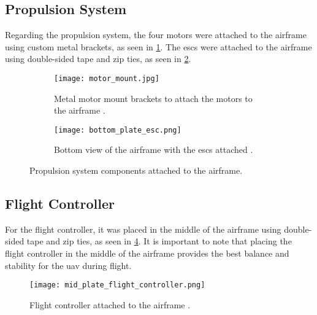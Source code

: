 \subsection{Propulsion System}\label{subsec:implementation_propulsion_system}

Regarding the propulsion system, the four motors were attached to the airframe using custom metal brackets, as seen in \cref{fig:motors_attached_to_airframe}. The \glspl{esc} were attached to the airframe using double-sided tape and zip ties, as seen in \cref{fig:esc_attached_to_airframe}.

\begin{figure}
  \begin{subfigure}{0.4\textwidth}
    \texttt{[image: motor\_mount.jpg]}
    \caption{Metal motor mount brackets to attach the motors to the airframe \autocite{developingcosteffectivedrones5g}.}\label{fig:motors_attached_to_airframe}
  \end{subfigure}
  \hfill
  \begin{subfigure}{0.4\textwidth}
    \texttt{[image: bottom\_plate\_esc.png]}
    \caption{Bottom view of the airframe with the \glspl{esc} attached \autocite{developingcosteffectivedrones5g}.}\label{fig:esc_attached_to_airframe}
  \end{subfigure}

  \caption{Propulsion system components attached to the airframe.}\label{fig:propulsion_system_components_attached_to_airframe}
\end{figure}

\subsection{Flight Controller}\label{subsec:implementation_flight_controller}

For the flight controller, it was placed in the middle of the airframe using double-sided tape and zip ties, as seen in \cref{fig:flight_controller_attached_to_airframe}. It is important to note that placing the flight controller in the middle of the airframe provides the best balance and stability for the \gls{uav} during flight.

\begin{figure}
  \texttt{[image: mid\_plate\_flight\_controller.png]}
  \caption{Flight controller attached to the airframe \autocite{developingcosteffectivedrones5g}.}\label{fig:flight_controller_attached_to_airframe}
\end{figure}

